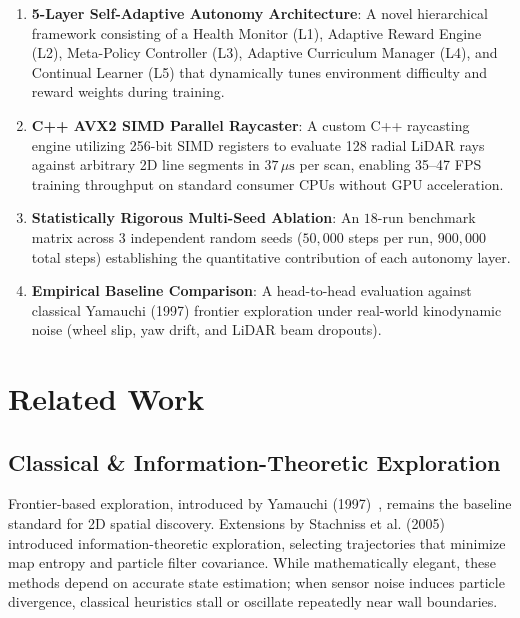 \documentclass[11pt,a4paper]{article}
\begin{document}
\begin{enumerate}
    \item \textbf{5-Layer Self-Adaptive Autonomy Architecture}: A novel hierarchical framework consisting of a Health Monitor (L1), Adaptive Reward Engine (L2), Meta-Policy Controller (L3), Adaptive Curriculum Manager (L4), and Continual Learner (L5) that dynamically tunes environment difficulty and reward weights during training.
    
    \item \textbf{C++ AVX2 SIMD Parallel Raycaster}: A custom C++ raycasting engine utilizing 256-bit SIMD registers to evaluate 128 radial LiDAR rays against arbitrary 2D line segments in $37\,\mu\text{s}$ per scan, enabling 35–47 FPS training throughput on standard consumer CPUs without GPU acceleration.
    
    \item \textbf{Statistically Rigorous Multi-Seed Ablation}: An $18$-run benchmark matrix across 3 independent random seeds ($50,000$ steps per run, $900,000$ total steps) establishing the quantitative contribution of each autonomy layer.
    
    \item \textbf{Empirical Baseline Comparison}: A head-to-head evaluation against classical Yamauchi (1997) frontier exploration under real-world kinodynamic noise (wheel slip, yaw drift, and LiDAR beam dropouts).
\end{enumerate}

\section{Related Work}

\subsection{Classical \& Information-Theoretic Exploration}

Frontier-based exploration, introduced by Yamauchi (1997)~\cite{yamauchi1997}, remains the baseline standard for 2D spatial discovery. Extensions by Stachniss et al. (2005)~\cite{stachniss2005} introduced information-theoretic exploration, selecting trajectories that minimize map entropy and particle filter covariance. While mathematically elegant, these methods depend on accurate state estimation; when sensor noise induces particle divergence, classical heuristics stall or oscillate repeatedly near wall boundaries.
\end{document}
